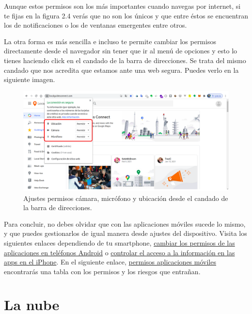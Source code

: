 \documentclass[
  a4paper,
  openany]{book}
\begin{document}
Aunque estos permisos son los más importantes cuando navegas por internet, si te fijas en la figura 2.4 verás que no son los únicos y que entre éstos se encuentran los de notificaciones o los de ventanas emergentes entre otros.

La otra forma es más sencilla e incluso te permite cambiar los permisos directamente desde el navegador sin tener que ir al menú de opciones y esto lo tienes haciendo click en el candado de la barra de direcciones. Se trata del mismo candado que nos acredita que estamos ante una web segura. Puedes verlo en la siguiente imagen.

\begin{figure}

{\centering \includegraphics[width=0.75\linewidth]{images/ajuste-permisos-desde-navegador} 

}

\caption{Ajustes permisos cámara, micrófono y ubicación desde el candado de la barra de direcciones.}\label{fig:unnamed-chunk-8}
\end{figure}

Para concluir, no debes olvidar que con las aplicaciones móviles sucede lo mismo, y que puedes gestionarlos de igual manera desde ajustes del dispositivo. Visita los siguientes enlaces dependiendo de tu smartphone, \href{https://support.google.com/android/answer/9431959?hl=es}{cambiar los permisos de las aplicaciones en teléfonos Android} o \href{https://support.apple.com/es-es/guide/iphone/iph251e92810/ios}{controlar el acceso a la información en las apps en el iPhone}. En el siguiente enlace, \href{https://www.osi.es/sites/default/files/docs/c5-eg-permisos-apps-riesgos.pdf}{permisos aplicaciones móviles} encontrarás una tabla con los permisos y los riesgos que entrañan.

\hypertarget{la-nube}{%
\section{La nube}\label{la-nube}}
\end{document}
